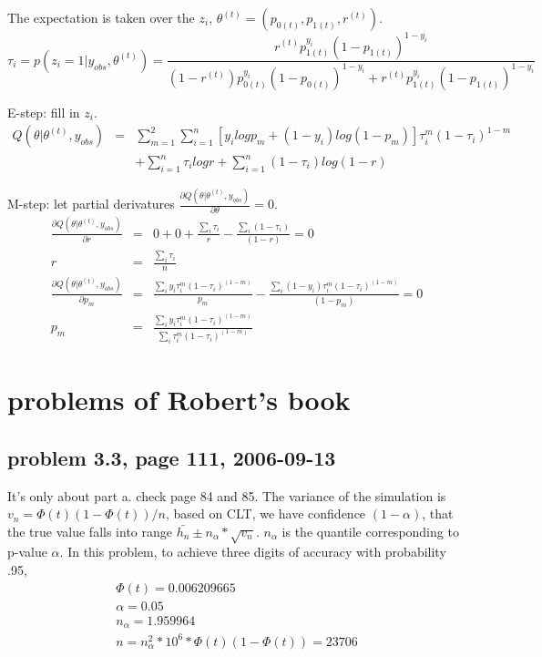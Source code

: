 \documentclass[a4paper,10pt]{article}
\begin{document}
The expectation is taken over the $z_i$, $\theta^{(t)} = (p_{0(t)}, p_{1(t)}, r^{(t)} )$.
\begin{displaymath}
\tau_i = p(z_i=1 | y_{obs}, \theta^{(t)}) =  \frac{r^{(t)} p_{1(t)}^{y_i} (1-p_{1(t)})^{1-y_i} } {(1-r^{(t)}) p_{0(t)}^{y_i} (1-p_{0(t)})^{1-y_i} + r^{(t)} p_{1(t)}^{y_i} (1-p_{1(t)})^{1-y_i} }
\end{displaymath}

E-step: fill in $z_i$.
\begin{eqnarray*}
Q(\theta | \theta^{(t)}, y_{obs} ) &=& \sum_{m=1}^2 \sum_{i=1}^n [y_i log p_m + (1-y_i) log(1-p_m)] \tau_i^m (1-\tau_i)^{1-m} \\
&& + \sum_{i=1}^n \tau_i log r + \sum_{i=1}^n (1-\tau_i) log (1-r)
\end{eqnarray*}

M-step: let partial derivatures $\frac{\partial Q(\theta | \theta^{(t)}, y_{obs} ) } {\partial \theta} = 0$.
\begin{eqnarray}
\frac{\partial Q(\theta | \theta^{(t)}, y_{obs} ) } {\partial r} & = & 0 + 0 + \frac{\sum_i\tau_i}{r} - \frac{\sum_i(1-\tau_i)}{(1-r)}= 0 \nonumber \\
r & = & \frac{\sum_i \tau_i}{n} \\
\frac{\partial Q(\theta | \theta^{(t)}, y_{obs} ) } {\partial p_m } & = & \frac{\sum_i y_i\tau_i^m (1-\tau_i)^{(1-m)} }{p_m} - \frac{\sum_i (1-y_i)\tau_i^m (1-\tau_i)^{(1-m)}}{(1-p_m)} = 0 \nonumber \\
p_m & = & \frac{\sum_i y_i \tau_i^m (1-\tau_i)^{(1-m)} }{ \sum_i \tau_i^m (1-\tau_i)^{(1-m)} }
\end{eqnarray}

\section{problems of Robert's book}
\subsection{problem 3.3, page 111, 2006-09-13}
It's only about part a. check page 84 and 85. The variance of the simulation is $v_n = \Phi(t)(1-\Phi(t))/n$, based on CLT, we have confidence $(1-\alpha)$, that the true value falls into range $\bar{h_n} \pm n_\alpha*\sqrt{v_n}$. $n_\alpha$ is the quantile corresponding to p-value $\alpha$. In this problem, to achieve three digits of accuracy with probability .95,
\begin{eqnarray}
\Phi(t) = 0.006209665 \nonumber \\
\alpha = 0.05 \nonumber \\
n_\alpha = 1.959964 \nonumber \\
n = n_\alpha^2 * 10^6 * \Phi(t)(1-\Phi(t)) = 23706 \nonumber
\end{eqnarray}
\end{document}
